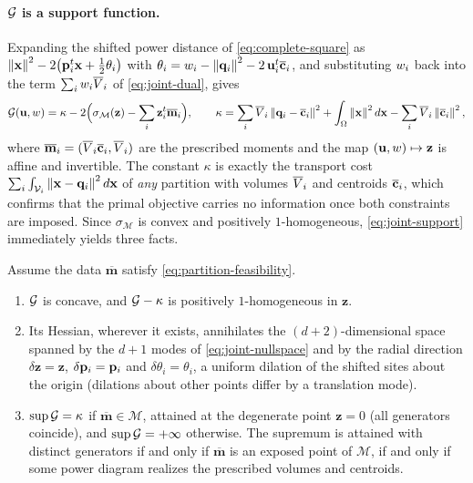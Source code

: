 \documentclass[main.tex]{subfiles}
\providecommand{\momset}{\mathcal{M}}            %
\providecommand{\tmom}{\overline{\mathbf{m}}}    %
\providecommand{\gen}{\mathbf{z}}                %
\providecommand{\support}{\sigma_{\momset}}      %
\begin{document}
\paragraph{$\mathcal{G}$ is a support function.}
Expanding the shifted power distance of \eqref{eq:complete-square} as $\left\lVert \mathbf{x} \right\rVert^2 - 2\bigl(\mathbf{p}_i^{t}\mathbf{x} + \tfrac12\theta_i\bigr)$ with $\theta_i = w_i - \left\lVert \mathbf{q}_i \right\rVert^2 - 2\,\mathbf{u}_i^{t}\overline{\mathbf{c}}_i$, and substituting $w_i$ back into the term $\sum_i w_i \overline{V}_i$ of \eqref{eq:joint-dual}, gives
\begin{equation}
  \jointdual(\shift, \weight)
  = \kappa - 2 \Bigl( \support(\gen) - \sum_i \gen_i\tr \tmom_i \Bigr) ,
  \qquad
  \kappa = \sum_i \pvol_i \norm{\qq_i - \tcentroid_i}^2 + \int_\domain \norm{\xx}^2 d\xx - \sum_i \pvol_i \norm{\tcentroid_i}^2 ,
  \label{eq:joint-support}
\end{equation}
where $\tmom_i = (\pvol_i \tcentroid_i, \pvol_i)$ are the prescribed moments and the map $(\shift, \weight) \mapsto \gen$ is affine and invertible.
The constant $\kappa$ is exactly the transport cost $\sum_i \int_{\mathcal{V}_i} \left\lVert \mathbf{x} - \mathbf{q}_i \right\rVert^2 d\mathbf{x}$ of \emph{any} partition with volumes $\overline{V}_i$ and centroids $\overline{\mathbf{c}}_i$, which confirms that the primal objective carries no information once both constraints are imposed.
Since $\support$ is convex and positively $1$-homogeneous, \eqref{eq:joint-support} immediately yields three facts.

\begin{proposition}
\label{prop:joint-structure}
Assume the data $\tmom$ satisfy \eqref{eq:partition-feasibility}.
\begin{enumerate}
  \item $\mathcal{G}$ is concave, and $\mathcal{G} - \kappa$ is positively $1$-homogeneous in $\gen$.
  \item Its Hessian, wherever it exists, annihilates the $(d\!+\!2)$-dimensional space spanned by the $d\!+\!1$ modes of \eqref{eq:joint-nullspace} and by the radial direction $\delta\gen = \gen$, \ie $\delta\mathbf{p}_i = \mathbf{p}_i$ and $\delta\theta_i = \theta_i$, a uniform dilation of the shifted sites about the origin (dilations about other points differ by a translation mode).
  \item $\sup \mathcal{G} = \kappa$ if $\tmom \in \momset$, attained at the degenerate point $\gen = 0$ (all generators coincide), and $\sup \mathcal{G} = +\infty$ otherwise.
  The supremum is attained with distinct generators if and only if $\tmom$ is an exposed point of $\momset$, \ie if and only if some power diagram realizes the prescribed volumes and centroids.
\end{enumerate}
\end{proposition}
\end{document}
